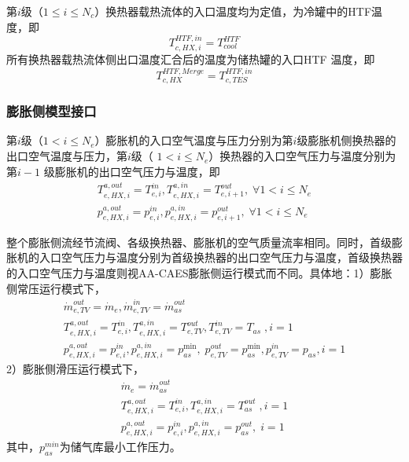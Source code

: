第$i$级（$1\le i\le {N_c}$）换热器载热流体的入口温度均为定值，为冷罐中的HTF温度，即
\begin{equation}
T_{c,HX,i}^{HTF,in} = T_{cool}^{HTF}
\end{equation}
所有换热器载热流体侧出口温度汇合后的温度为储热罐的入口HTF 温度，即
\begin{equation}
T_{c,HX}^{HTF,Merge} = T_{c,TES}^{HTF,in}
\end{equation}

\subsubsection{膨胀侧模型接口}
第$i$级（$1<i\le N_e$）膨胀机的入口空气温度与压力分别为第$i$级膨胀机侧换热器的出口空气温度与压力，第$i$级（ $1<i\le N_e$）换热器的入口空气压力与温度分别为第$i-1$ 级膨胀机的出口空气压力与温度，即
\begin{subequations}
\begin{gather}
T_{e,HX,i}^{a,out} = T_{e,i}^{in},T_{e,HX,i}^{a,in} = T_{e,i + 1}^{out},\;\forall 1<i\le N_e\\
p_{e,HX,i}^{a,out} = p_{e,i}^{in},p_{e,HX,i}^{a,in} = p_{e,i + 1}^{out},\;\forall 1<i\le N_e
\end{gather}
\end{subequations}

整个膨胀侧流经节流阀、各级换热器、膨胀机的空气质量流率相同。同时，首级膨胀机的入口空气压力与温度分别为首级换热器的出口空气压力与温度，首级换热器的入口空气压力与温度则视AA-CAES膨胀侧运行模式而不同。具体地：1）膨胀侧常压运行模式下，
\begin{subequations}
\begin{gather}
\dot m_{e,TV}^{out} = {{\dot m}_e},\dot m_{e,TV}^{in} = \dot m_{as}^{out}\\
T_{e,HX,i}^{a,out} = T_{e,i}^{in},T_{e,HX,i}^{a,in} = T_{e,TV}^{out},T_{e,TV}^{in} = T_{as}\;,i = 1\\
p_{e,HX,i}^{a,out} = p_{e,i}^{in},p_{e,HX,i}^{a,in} = p_{as}^{\min },\;p_{e,TV}^{out} = p_{as}^{\min },p_{e,TV}^{in} = p_{as}^{},i = 1
\end{gather}
\end{subequations}
2）膨胀侧滑压运行模式下，
\begin{subequations}
\begin{gather}
{{\dot m}_e} = \dot m_{as}^{out}\\
T_{e,HX,i}^{a,out} = T_{e,i}^{in},T_{e,HX,i}^{a,in} = T_{as}^{out}\;,i = 1\\
p_{e,HX,i}^{a,out} = p_{e,i}^{in},p_{e,HX,i}^{a,in} = p_{as}^{out},\;i = 1
\end{gather}
\end{subequations}
其中，$p_{as}^{min}$为储气库最小工作压力。

